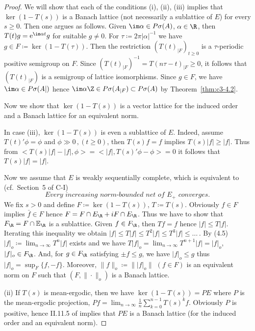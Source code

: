 \begin{proof}
	We will show that each of the conditions (i), (ii), (iii) implies that $\ker(1 - T(s))$ is a Banach lattice (not necessarily a sublattice of $E$) for every $s \geq 0$. 
	Then one argues as follows. Given $\im\alpha \in P\sigma(A)$, $\alpha \in \R $, then $T(t)g = \mathrm{e}^{\im\alpha t}g$ for suitable $g \neq 0$. 
	For $\tau \coloneqq  2\pi|\alpha|^{-1}$ we have $g \in F \coloneqq  \ker (1 - T(\tau))$. 
	Then the restriction $(T(t)_{|F})_{t \geq 0}$ is a $\tau$-periodic positive semigroup on $F$. 
	Since $\left(T(t)_{|F}\right)^{-1} = T(n\tau-t)_{|F} \geq 0$, it follows that $(T(t)_{|F})$ is a semigroup of lattice isomorphisms. 
	Since $g \in F$, we have $\im\alpha \in P\sigma(A|)$ hence $\im\alpha\Z \in P\sigma(A_{|F}) \subset P\sigma(A)$ by Theorem~\ref{thm:c3-4.2}.
	
	Now we show that $\ker (1 - T(s))$ is a vector lattice for the induced order and a Banach lattice for an equivalent norm.
	
	In case (iii), $\ker (1 - T(s))$ is even a sublattice of $E$. 
	Indeed, assume $T(t)'\phi = \phi$ and $\phi \gg 0\,, (t \geq 0)$, then $T(s)f = f$ implies $T(s)|f| \geq |f|$. 
	Thus from $<T(s)|f| - |f|,\phi> = <|f|,T(s)'\phi - \phi> = 0$ it follows that $T(s)|f| = |f|$.
	
	Now we assume that $E$ is weakly sequentially complete, which is equivalent to (cf.\ Section~5 of C-I)
	\begin{equation}\label{eq:c3-4.5}
	\textit{Every increasing norm-bounded net of $E_{+}$ converges}.
	\end{equation}
	We fix $s > 0$ and define $F \coloneqq  \ker (1 - T(s))$, $T \coloneqq  T(s)$. 
	Obviously $f \in F$ implies $\bar{f} \in F$ hence $F = F\cap E_{\R } + iF\cap E_{\R }$. 
	Thus we have to show that $F_{\R } = F\cap\mathbb{E}_{\R }$ is a sublattice. 
	Given $f \in F_{\R }$, then $Tf = f$ hence $|f| \leq T|f|$. 
	Iterating this inequality we obtain $|f| \leq T|f| \leq T^{2}|f| \leq T^{3}|f| \leq \dots\,.$ 
	By (4.5) $|f|_{o} \coloneqq  \lim_{n\to \infty} T^{n}|f|$ exists and we have $T|f|_{o} = \lim_{n\to \infty} T^{n+1}|f| = |f|_{o}$, \ie $|f|_{o} \in F_{\R }$.
	And, for $g \in F_{\R }$ satisfying $\pm f \leq g$, we have $|f|_{o} \leq g$ thus $|f|_{o} = \sup_{F}\{f,-f\}$. 
	Moreover, $\|f\|_{o} \coloneqq  \||f|_{o}\|$ $(f \in F)$ is an equivalent norm on $F$ such that $(F,\|\cdot\|_{o})$ is a Banach lattice.
	
	(ii) If $T(s)$ is mean-ergodic, then we have $\ker (1 - T(s)) = PE$ where $P$ is the mean-ergodic projection, \ie $Pf = \lim_{n\to \infty}\frac{1}{n}\sum_{k=0}^{n-1}T(s)^{k}f$.
	Obviously $P$ is positive, hence II.11.5 of \citet{schaefer:1974} implies that $PE$ is a Banach lattice (for the induced order and an equivalent norm).
\end{proof}

